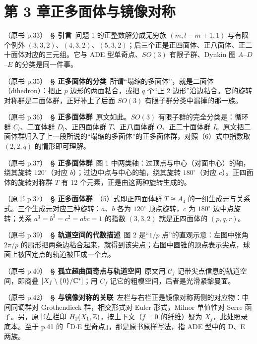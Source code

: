 \section*{第 3 章\quad 正多面体与镜像对称}

\noindent （原书 p.33）\ \textbf{§ 引言}\ 问题 1 的正整数解分成无穷族 $(m,l-m+1,1)$ 与有限个例外 $(3,3,2)$、$(4,3,2)$、$(5,3,2)$；后三个正是正四面体、正八面体、正二十面体对应的三元组。它与 ADE 型单奇点、$SO(3)$ 有限子群、Dynkin 图 $A$--$D$--$E$ 的分类是同一件事。\par\smallskip

\noindent （原书 p.35）\ \textbf{§ 正多面体的分类}\ 所谓“塌缩的多面体”，就是二面体（dihedron）：把正 $p$ 边形的两面粘合，或把 $q$ 个“正 2 边形”沿边粘合。它的旋转对称群是二面体群，正好补上了后面 $SO(3)$ 有限子群分类中漏掉的那一族。\par\smallskip

\noindent （原书 p.36）\ \textbf{§ 正多面体群}\ 原文如此。$SO(3)$ 有限子群的完全分类是：循环群 $C_l$、二面体群 $D_l$、正四面体群 $T$、正八面体群 $O$、正二十面体群 $I$。原文把二面体群归入了上一段所说的“塌缩的多面体”的正多面体群，对照（6）式中指数取 $(2,2,q)$ 的情形即可理解。\par\smallskip

\noindent （原书 p.37）\ \textbf{§ 正多面体群}\ 图 1 中两类轴：过顶点与中心（对面中心）的轴，绕其旋转 $120^\circ$（对应 $b$）；过边中点与中心的轴，绕其旋转 $180^\circ$（对应 $c$）。正四面体的旋转对称群 $T$ 有 12 个元素，正是由这两种旋转生成的。\par\smallskip

\noindent （原书 p.37）\ \textbf{§ 正多面体群}\ （5）式即正四面体群 $T\cong A_4$ 的一组生成元与关系式。三个生成元对应三种旋转：$a$、$b$ 各为 $120^\circ$ 顶点旋转，$c$ 为 $180^\circ$ 边中点旋转；关系 $a^3=b^3=c^2=abc=1$ 的指数 $(3,3,2)$ 就是正四面体的 $(p,q,r)$。\par\smallskip

\noindent （原书 p.39）\ \textbf{§ 轨道空间的代数描述}\ 图 2 是“$1/p$ 点”的直观示意：左图中张角 $2\pi/p$ 的扇形把两条边粘合起来，就得到该尖点；右图中圆锥的顶点表示尖点，球面上被固定点的轨道被压成一个点。\par\smallskip

\noindent （原书 p.40）\ \textbf{§ 孤立超曲面奇点与轨道空间}\ 原文用 $\mathcal{C}_f$ 记带尖点信息的轨道空间，即商叠 $[X_f\setminus\{0\}/\mathbb{C}^*]$；用 $C_f$ 记它的粗模空间，后者是光滑紧黎曼面。\par\smallskip

\noindent （原书 p.42）\ \textbf{§ 与镜像对称的关联}\ 左栏与右栏正是镜像对称两侧的对应物：中间同调群对 Grothendieck 群，相交形式对 Euler 形式，Milnor 单值性对 Serre 函子。另，原书左栏印 $H_2(X_1,\mathbb{Z})$，按上下文（$f=0$ 的纤维）疑为 $X_f$，此处照录底本。至于 p.41 的「D$\cdot$E 型奇点」，那是原书原样写法，指 ADE 型中的 D、E 两族。\par\smallskip

